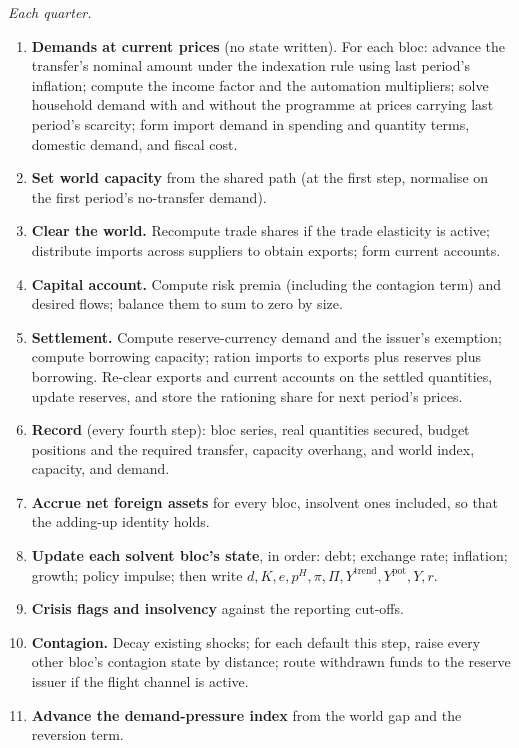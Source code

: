 \documentclass[preprint,review,12pt]{elsarticle}
\providecommand{\tightlist}{%
  \setlength{\itemsep}{0pt}\setlength{\parskip}{0pt}}
\begin{document}
\emph{Each quarter.}

\begin{enumerate}
\def\labelenumi{\arabic{enumi}.}
\setcounter{enumi}{5}
\tightlist
\item
  \textbf{Demands at current prices} (no state written). For each bloc:
  advance the transfer's nominal amount under the indexation rule using
  last period's inflation; compute the income factor and the automation
  multipliers; solve household demand with and without the programme at
  prices carrying last period's scarcity; form import demand in spending
  and quantity terms, domestic demand, and fiscal cost.
\item
  \textbf{Set world capacity} from the shared path (at the first step,
  normalise on the first period's no-transfer demand).
\item
  \textbf{Clear the world.} Recompute trade shares if the trade
  elasticity is active; distribute imports across suppliers to obtain
  exports; form current accounts.
\item
  \textbf{Capital account.} Compute risk premia (including the contagion
  term) and desired flows; balance them to sum to zero by size.
\item
  \textbf{Settlement.} Compute reserve-currency demand and the issuer's
  exemption; compute borrowing capacity; ration imports to exports plus
  reserves plus borrowing. Re-clear exports and current accounts on the
  settled quantities, update reserves, and store the rationing share for
  next period's prices.
\item
  \textbf{Record} (every fourth step): bloc series, real quantities
  secured, budget positions and the required transfer, capacity
  overhang, and world index, capacity, and demand.
\item
  \textbf{Accrue net foreign assets} for every bloc, insolvent ones
  included, so that the adding-up identity holds.
\item
  \textbf{Update each solvent bloc's state}, in order: debt; exchange
  rate; inflation; growth; policy impulse; then write
  \(d, K, e, p^H, \pi, \Pi, Y^{\mathrm{trend}}, Y^{\mathrm{pot}}, Y, r\).
\item
  \textbf{Crisis flags and insolvency} against the reporting cut-offs.
\item
  \textbf{Contagion.} Decay existing shocks; for each default this step,
  raise every other bloc's contagion state by distance; route withdrawn
  funds to the reserve issuer if the flight channel is active.
\item
  \textbf{Advance the demand-pressure index} from the world gap and the
  reversion term.
\end{enumerate}
\end{document}
